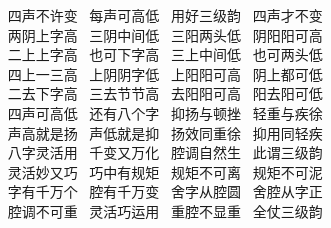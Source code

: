 \hspace*{50pt}~ 四声不许变~\hspace{40pt} 每声可高低~\hspace{40pt} 用好三级韵~\hspace{40pt} 四声才不变\\
\hspace*{50pt}~ 两阴上字高~\hspace{40pt} 三阴中间低~\hspace{40pt} 三阳两头低~\hspace{40pt} 阴阳阳可高\\
\hspace*{50pt}~ 二上上字高~\hspace{40pt} 也可下字高~\hspace{40pt} 三上中间低~\hspace{40pt} 也可两头低\\
\hspace*{50pt}~ 四上一三高~\hspace{40pt} 上阴阴字低~\hspace{40pt} 上阳阳可高~\hspace{40pt} 阴上都可低\\
\hspace*{50pt}~ 二去下字高~\hspace{40pt} 三去节节高~\hspace{40pt} 去阳阳可高~\hspace{40pt} 阳去阳可低\\
\hspace*{50pt}~ 四声可高低~\hspace{40pt} 还有八个字~\hspace{40pt} 抑扬与顿挫~\hspace{40pt} 轻重与疾徐\\
\hspace*{50pt}~ 声高就是扬~\hspace{40pt} 声低就是抑~\hspace{40pt} 扬效同重徐~\hspace{40pt} 抑用同轻疾\\
\hspace*{50pt}~ 八字灵活用~\hspace{40pt} 千变又万化~\hspace{40pt} 腔调自然生~\hspace{40pt} 此谓三级韵\\
\hspace*{50pt}~ 灵活妙又巧~\hspace{40pt} 巧中有规矩~\hspace{40pt} 规矩不可离~\hspace{40pt} 规矩不可泥\\
\hspace*{50pt}~ 字有千万个~\hspace{40pt} 腔有千万变~\hspace{40pt} 舍字从腔圆~\hspace{40pt} 舍腔从字正\\
\hspace*{50pt}~ 腔调不可重~\hspace{40pt} 灵活巧运用~\hspace{40pt} 重腔不显重~\hspace{40pt} 全仗三级韵
